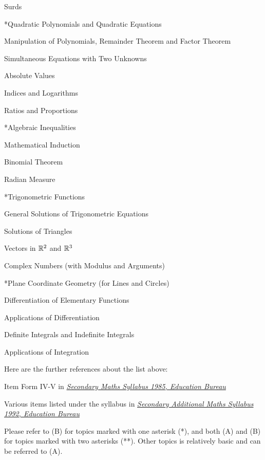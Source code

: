 \documentclass[a4paper,12pt]{article}
\begin{document}
\begin{alist}
  \item Surds
  \item **Quadratic Polynomials and Quadratic Equations
  \item Manipulation of Polynomials, Remainder Theorem and Factor Theorem
  \item Simultaneous Equations with Two Unknowns
  \item *Absolute Values
  \item Indices and Logarithms
  \item Ratios and Proportions
  \item **Algebraic Inequalities
  \item *Mathematical Induction
  \item *Binomial Theorem
  \item *Radian Measure
  \item **Trigonometric Functions
  \item *General Solutions of Trigonometric Equations
  \item *Solutions of Triangles
  \item *Vectors in $\mathbb{R}^{2}$ and $\mathbb{R}^{3}$
  \item *Complex Numbers (with Modulus and Arguments)
  \item **Plane Coordinate Geometry (for Lines and Circles)
  \item *Differentiation of Elementary Functions
  \item *Applications of Differentiation
  \item *Definite Integrals and Indefinite Integrals
  \item *Applications of Integration
\end{alist}

\pagebreak

Here are the further references about the list above:

\begin{Alist}
  \item Item Form IV-V in \href{https://www.edb.gov.hk/en/curriculum-development/kla/ma/curr/sec-math-1985.html}{\textit{Secondary Maths Syllabus 1985, Education Bureau}}
  \item Various items listed under the syllabus in \href{http://www.edb.gov.hk/en/curriculum-development/kla/ma/curr/add-math-1992.html}{\textit{Secondary Additional Maths Syllabus 1992, Education Bureau}}
\end{Alist}

Please refer to (B) for topics marked with one asterisk (*), and both (A) and (B) for topics marked with two asterisks (**). Other topics is relatively basic and can be referred to (A).\n
\end{document}

